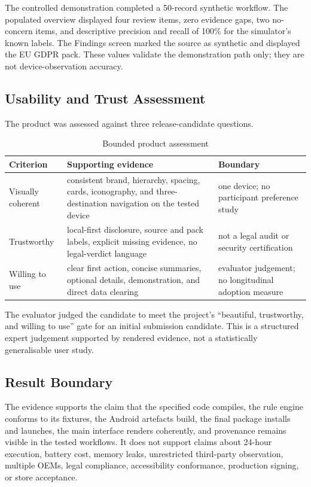 The controlled demonstration completed a 50-record synthetic workflow. The populated overview displayed four review items, zero evidence gaps, two no-concern items, and descriptive precision and recall of 100\% for the simulator's known labels. The Findings screen marked the source as synthetic and displayed the EU GDPR pack. These values validate the demonstration path only; they are not device-observation accuracy.

\subsection{Usability and Trust Assessment}

The product was assessed against three release-candidate questions.

\begin{table}[H]
\centering
\small
\caption{Bounded product assessment}
\begin{tabular}{p{}p{}p{}}
\toprule
Criterion & Supporting evidence & Boundary \\
\midrule
Visually coherent & consistent brand, hierarchy, spacing, cards, iconography, and three-destination navigation on the tested device & one device; no participant preference study \\
Trustworthy & local-first disclosure, source and pack labels, explicit missing evidence, no legal-verdict language & not a legal audit or security certification \\
Willing to use & clear first action, concise summaries, optional details, demonstration, and direct data clearing & evaluator judgement; no longitudinal adoption measure \\
\bottomrule
\end{tabular}
\end{table}

The evaluator judged the candidate to meet the project's ``beautiful, trustworthy, and willing to use'' gate for an initial submission candidate. This is a structured expert judgement supported by rendered evidence, not a statistically generalisable user study.

\subsection{Result Boundary}

The evidence supports the claim that the specified code compiles, the rule engine conforms to its fixtures, the Android artefacts build, the final package installs and launches, the main interface renders coherently, and provenance remains visible in the tested workflows. It does not support claims about 24-hour execution, battery cost, memory leaks, unrestricted third-party observation, multiple OEMs, legal compliance, accessibility conformance, production signing, or store acceptance.
